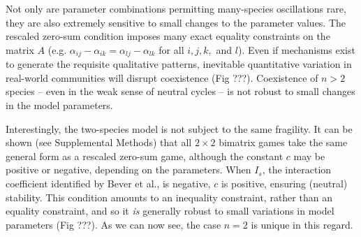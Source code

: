 \documentclass[11pt]{article}
\begin{document}
Not only are parameter combinations permitting many-species oscillations rare, they are also extremely sensitive to small changes to the parameter values. The rescaled zero-sum condition imposes many exact equality constraints on the matrix $A$ (e.g. $\alpha_{ij} - \alpha_{ik} = \alpha_{lj} - \alpha_{lk}$ for all $i, j, k,$ and $l$). Even if mechanisms exist to generate the requisite qualitative patterns, inevitable quantitative variation in real-world communities will disrupt coexistence (Fig ???). Coexistence of $n > 2$ species -- even in the weak sense of neutral cycles -- is not robust to small changes in the model parameters.

Interestingly, the two-species model is not subject to the same fragility. It can be shown (see Supplemental Methods) that all $2 \times 2$ bimatrix games take the same general form as a rescaled zero-sum game, although the constant $c$ may be positive or negative, depending on the parameters. When $I_s$, the interaction coefficient identified by Bever et al., is negative, $c$ is positive, ensuring (neutral) stability. This condition amounts to an inequality constraint, rather than an equality constraint, and so it \emph{is} generally robust to small variations in model parameters (Fig ???). As we can now see, the case $n = 2$ is unique in this regard. 
\end{document}
